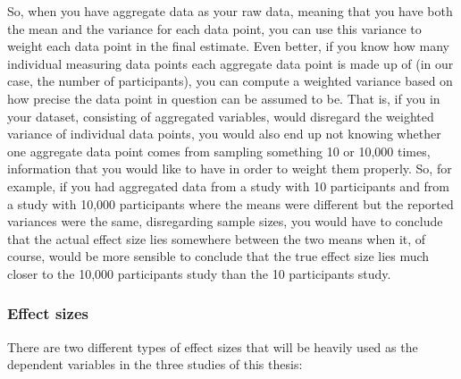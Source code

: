 So, when you have aggregate data as your raw data, meaning that you have both the mean and the variance for each data point, you can use this variance to weight each data point in the final estimate. Even better, if you know how many individual measuring data points each aggregate data point is made up of (in our case, the number of participants), you can compute a weighted variance based on how precise the data point in question can be assumed to be. That is, if you in your dataset, consisting of aggregated variables, would disregard the weighted variance of individual data points, you would also end up not knowing whether one aggregate data point comes from sampling something 10 or 10,000 times, information that you would like to have in order to weight them properly. So, for example, if you had aggregated data from a study with 10 participants and from a study with 10,000 participants where the means were different but the reported variances were the same, disregarding sample sizes, you would have to conclude that the actual effect size lies somewhere between the two means when it, of course, would be more sensible to conclude that the true effect size lies much closer to the 10,000 participants study than the 10 participants study.

\subsubsection{Effect sizes} \label{Effect_sizes}

There are two different types of effect sizes that will be heavily used as the dependent variables in the three studies of this thesis:

